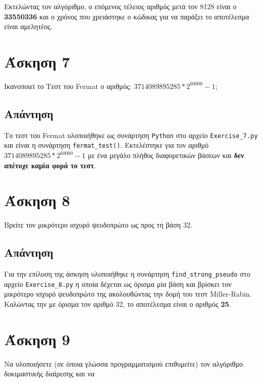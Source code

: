 \documentclass[12pt]{article}
\begin{document}
Εκτελώντας τον αλγόριθμο, ο επόμενος τέλειος αριθμός μετά τον 8128 είναι ο \textbf{33550336} και ο χρόνος που χρειάστηκε ο κώδικας για να παράξει το αποτέλεσμα είναι αμελητέος.
\hfill \blacksquare
\section*{Άσκηση 7}

Ικανοποιεί το Τεστ του Fermat ο αριθμός:  \(3714089895285 * 2^{60000} - 1\);

\subsection*{Απάντηση}

Το τεστ του Fermat υλοποιήθηκε ως συνάρτηση \texttt{Python} στο αρχείο 
\texttt{Exercise\_7.py} και είναι η συνάρτηση \texttt{fermat\_test()}. Εκτελέστηκε για τον αριθμό  \(3714089895285 * 2^{60000} - 1\) με ένα μεγάλο πλήθος διαφορετικών βάσεων και \textbf{δεν απέτυχε καμία φορά το τεστ}.
\hfill \blacksquare

\section*{Άσκηση 8}

Βρείτε τον μικρότερο ισχυρό ψευδοπρώτο ως προς τη βάση 32.

\subsection*{Απάντηση}

Για την επίλυση της άσκηση υλοποιήθηκε η συνάρτηση \texttt{find\_strong\_pseudo} στο αρχείο \texttt{Exercise\_8.py} η οποία δέχεται ως όρισμα μία βάση και βρίσκει τον μικρότερο ισχυρό ψευδοπρώτο της ακολουθώντας την δομή του τεστ Miller-Rabin. 
\newline
\newline
Καλώντας την με όρισμα τον αριθμό 32, το αποτέλεσμα είναι ο αριθμός \textbf{25}.

\hfill \blacksquare
\section*{Άσκηση 9}

Να υλοποιήσετε (σε όποια γλώσσα προγραμματισμού επιθυμείτε) τον αλγόριθμο δοκιμαστικής διαίρεσης και να 
\end{document}

